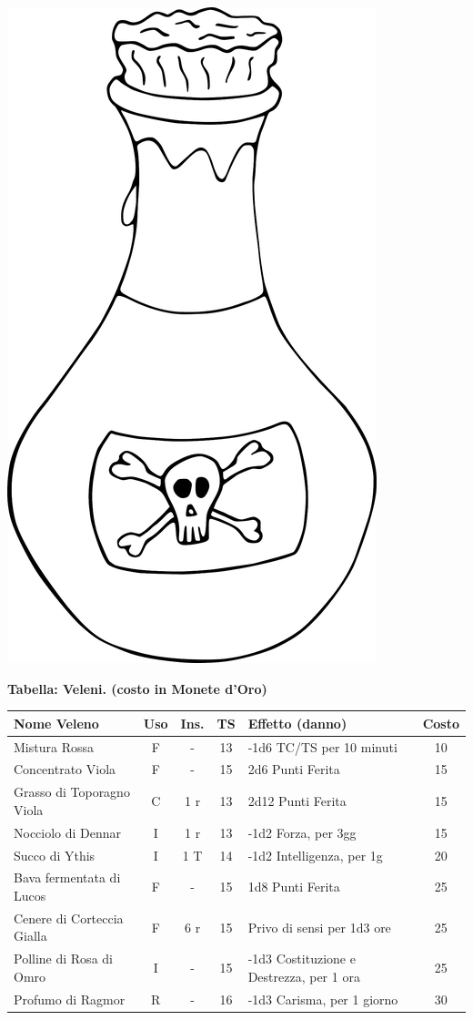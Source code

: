 \vfill

\begin{center}
	\includegraphics[height=0.25\linewidth]{immagini/poison.png}
\end{center}

\textbf{Tabella: Veleni. (costo in Monete d'Oro)}\label{tabellaveleni}

\medskip

	\noindent\begin{tabularx}{\linewidth}{lcccXc}
	\toprule
	\textbf{Nome Veleno} & \textbf{Uso} & \textbf{Ins.} & \textbf{TS} & \textbf{Effetto (danno)} & \textbf{Costo}\\
\toprule
	Mistura Rossa \index{Mistura Rossa} & F& -& 13& -1d6 TC/TS per 10 minuti & 10\\

	Concentrato Viola \index{Concentrato Viola} & F& -& 15& 2d6 Punti Ferita & 15\\

	Grasso di Toporagno Viola \index{Grasso di Toporagno Viola} & C& 1 r& 13& 2d12 Punti Ferita & 15\\

	Nocciolo di Dennar \index{Nocciolo di Dennar}& I& 1 r& 13& -1d2 Forza, per 3gg& 15\\

	Succo di Ythis\index{Succo di Ythis} & I& 1 T& 14& -1d2 Intelligenza, per 1g& 20\\

	Bava fermentata di Lucos \index{Bava fermentata di Lucos}\label{bavadilucos}\hypertarget{bavadilucos}{}& F& - & 15& 1d8 Punti Ferita& 25\\

	Cenere di Corteccia Gialla \index{Cenere di Corteccia Gialla} & F& 6 r& 15& Privo di sensi per 1d3 ore& 25\\

	Polline di Rosa di Omro\index{Polline di Rosa di Omro} & I& - & 15& -1d3 Costituzione e Destrezza, per 1 ora & 25\\

	Profumo di Ragmor \index{Profumo di Ragmor}& R& - & 16& -1d3 Carisma, per 1 giorno & 30\\


\end{tabularx}

